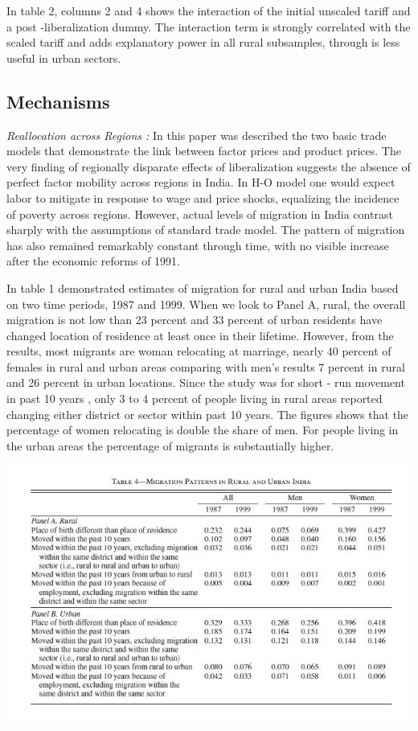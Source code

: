 \documentclass[a4paper,12pt]{article}
\begin{document}
In table 2, columns 2 and 4 shows the interaction of the initial unscaled tariff and a post -liberalization dummy. The interaction term is strongly correlated with the scaled tariff and adds explanatory power in all rural subsamples, through is less useful in urban sectors. 

\subsection{Mechanisms}

\textit{Reallocation across Regions :} In this paper was described the two basic trade models that demonstrate the link between factor prices and product prices. The very finding of regionally disparate effects of liberalization suggests the absence of perfect factor mobility across regions in India. In H-O model one would expect labor to mitigate in response to wage and price shocks, equalizing the incidence of poverty across regions. However, actual levels of migration in India contrast sharply with the assumptions of standard trade model. The pattern of migration has also remained remarkably constant through time, with no visible increase after the economic reforms of 1991. 

In table 1 demonstrated estimates of migration for rural and urban India based on two time periods, 1987 and 1999.  When we look to Panel A, rural, the overall migration is not low than 23 percent and 33 percent of urban residents have changed location of residence at least once in their lifetime.  However, from the results, most migrants are woman relocating at marriage, nearly 40 percent of females in rural and urban areas comparing with men's results 7 percent in rural and 26 percent in urban locations. Since the study was for short - run movement in past 10 years , only 3 to 4 percent of people living in rural areas reported changing either district or sector within past 10 years.  The figures shows that the percentage of women relocating is double the share of men. For people living in the urban areas the percentage of migrants is substantially higher. 

\begin{table}[h]
\centering
\includegraphics[width=1\textwidth]{table4.JPG}
\caption{\label{fig:Figure1}}
\end{table}
\end{document}
